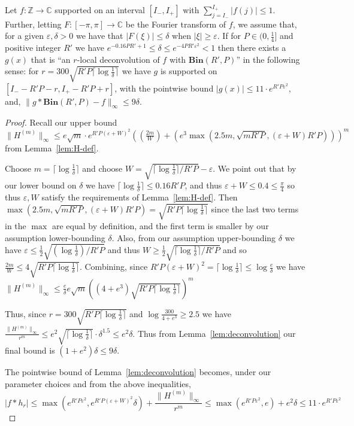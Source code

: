 \documentclass[11pt]{article}
\theoremstyle{plain}
\newcommand{\Bin}[2]{\textbf{Bin}(#1,#2)}
\newcommand{\eps}{\varepsilon}
\begin{document}
\begin{corollary}\label{cor:deconvolution}
Let $f:\mathbb{Z}\rightarrow\mathbb{C}$ supported on an interval $[I_-,I_+]$ with $\sum_{j=I_-}^{I_+} |f(j)| \leq 1$. Further, letting $F:[-\pi,\pi]\rightarrow\mathbb{C}$ be the Fourier transform of $f$, we assume that, for a given $\eps,\delta>0$ we have that $|F(\xi)|\leq\delta$ when $|\xi|\geq \eps$. 
If for $P\in(0,\frac{1}{4}]$ and positive integer $R'$ we have $e^{-0.16PR'+1}\leq\delta\leq e^{-4PR'\eps^2}<1$ then there exists a $g(x)$ that is ``an $r$-local deconvolution of $f$ with $\Bin{R'}{P}$'' in the following sense: for $r=300\sqrt{R'P\lceil\log\frac{1}{\delta}\rceil}$ we have $g$ is supported on $[I_--R'P-r,I_+-R'P+r]$, with the pointwise bound $|g(x)|\leq 11\cdot e^{R'P\eps^2}$, and, $\|g\ast \Bin{R'}{P}-f\|_\infty\leq 9\delta$.
\end{corollary}

\begin{proof}
Recall our upper bound $\|H^{(m)}\|_{\infty}\leq e\sqrt{m}\cdot e^{R'P(\eps+W)^2} \left((\frac{2m}{W})+(e^3\max(2.5 m,\sqrt{mR'P},(\eps+W) R'P))\right)^m$ from Lemma~\ref{lem:H-def}.


Choose $m=\lceil\log\frac{1}{\delta}\rceil$ and choose $W=\sqrt{\lceil\log\frac{1}{\delta}\rceil/R'P}-\eps$. We point out that by our lower bound on $\delta$ we have $\lceil\log\frac{1}{\delta}\rceil\leq 0.16 R'P$, and thus $\eps+W\leq 0.4\leq\frac{\pi}{4}$ so thus $\eps,W$ satisfy the requirements of Lemma~\ref{lem:H-def}. Then $\max(2.5 m,\sqrt{mR'P},(\eps+W) R'P)=\sqrt{R'P\lceil\log\frac{1}{\delta}\rceil}$ since the last two terms in the $\max$ are equal by definition, and the first term is smaller by our assumption lower-bounding $\delta$. Also, from our assumption upper-bounding $\delta$ we have $\eps\leq \frac{1}{2}\sqrt{(\log\frac{1}{\delta})/R'P}$ and thus $W\geq \frac{1}{2}\sqrt{\lceil\log\frac{1}{\delta}\rceil/R'P}$ and so $\frac{2m}{W}\leq 4\sqrt{R'P\lceil\log\frac{1}{\delta}\rceil}$. Combining, since $R'P(\eps+W)^2=\lceil\log\frac{1}{\delta}\rceil\leq\log\frac{e}{\delta}$ we have $\|H^{(m)}\|_{\infty}\leq \frac{e}{\delta}e\sqrt{m}\left((4+e^3)\sqrt{R'P\lceil\log\frac{1}{\delta}\rceil}\right)^m$

Thus, since $r=300\sqrt{R'P\lceil\log\frac{1}{\delta}\rceil}$ and $\log\frac{300}{4+e^3}\geq 2.5$ we have $\frac{\|H^{(m)}\|_{\infty}}{r^m}\leq e^2\sqrt{\lceil\log\frac{1}{\delta}\rceil}\cdot\delta^{1.5}\leq e^2\delta$. Thus from Lemma~\ref{lem:deconvolution} our final bound is $(1+e^2)\delta\leq 9\delta$.

The pointwise bound of Lemma~\ref{lem:deconvolution} becomes, under our parameter choices and from the above inequalities, \[|f\ast h_r|\leq \max(e^{R'P\eps^2}, e^{R'P(\eps+W)^2}\delta)+\frac{ \|H^{(m)}\|_{\infty}}{r^m}\leq \max(e^{R'P\eps^2},e)+e^2\delta\leq 11\cdot e^{R'P\eps^2}\]
\end{proof}
\end{document}

